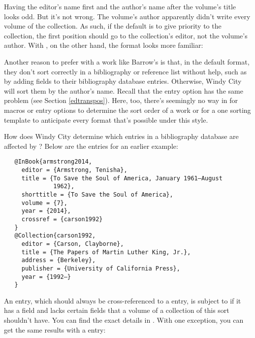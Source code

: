 \documentclass[11pt,letterpaper,oneside]{article}
\begin{document}
\begin{citebib}
\item \cite{barrows1959}
\end{citebib}

Having the editor's name first and the author's name after the
volume's title looks odd. But it's not wrong. The volume's author
apparently didn't write every volume of the collection. As such, if
the default is to give priority to the collection, the first position
should go to the collection's editor, not the volume's author. With
, on the other hand, the format looks more familiar:

\begin{citebib}
\item \cite{barrows1959}
\end{citebib}

Another reason to prefer  with a work like Barrow's is
that, in the default format, they don't sort correctly in a
bibliography or reference list without help, such as by adding
 fields to their bibliography database entries.
Otherwise, Windy City will sort them by the author's name. Recall that
the entry option  has the same problem (see Section
\ref{edtranspos}). Here, too, there's seemingly no way in \biblatex
for macros or entry options to determine the sort order of a work or
for a one sorting template to anticipate every format that's possible
under this style.

How does Windy City determine which entries in a bibliography database
are affected by ? Below are the entries for an earlier
example:

\begin{verbatim}
   @InBook{armstrong2014,
     editor = {Armstrong, Tenisha},
     title = {To Save the Soul of America, January 1961–August
              1962},
     shorttitle = {To Save the Soul of America},
     volume = {7},
     year = {2014},
     crossref = {carson1992}
   }
   @Collection{carson1992,
     editor = {Carson, Clayborne},
     title = {The Papers of Martin Luther King, Jr.},
     address = {Berkeley},
     publisher = {University of California Press},
     year = {1992–}
   }
\end{verbatim}

An  entry, which should always be cross-referenced to
a  entry, is subject to  if it has a
 field and lacks certain fields that a volume of a
collection of this sort shouldn't have. You can find the exact details
in . With one exception, you can get the same
results with a  entry:
\end{document}
